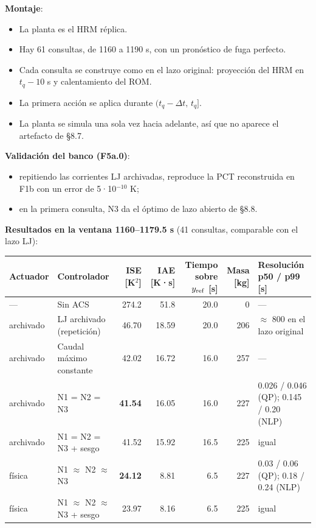 \documentclass[11pt,a4paper]{article}
\begin{document}
\textbf{Montaje}:

\begin{itemize}
\item La planta es el HRM réplica.
\item Hay 61 consultas, de 1160 a 1190 s, con un pronóstico de fuga perfecto.
\item Cada consulta se construye como en el lazo original: proyección del HRM en $t_q-10$ s y calentamiento del ROM.
\item La primera acción se aplica durante $(t_q-\Delta t,\,t_q]$.
\item La planta se simula una sola vez hacia adelante, así que no aparece el artefacto de \S{}8.7.
\end{itemize}

\textbf{Validación del banco (F5a.0)}:

\begin{itemize}
\item repitiendo las corrientes LJ archivadas, reproduce la PCT reconstruida en F1b con un error de 5·10$^{-10}$ K;
\item en la primera consulta, N3 da el óptimo de lazo abierto de \S{}8.8.
\end{itemize}

\textbf{Resultados en la ventana 1160–1179.5 s} (41 consultas, comparable con el lazo LJ):

{\footnotesize
\begin{xltabular}{\linewidth}{@{}YYRRRRY@{}}
\toprule
\textbf{Actuador} & \textbf{Controlador} & \textbf{ISE [K$^{2}$]} & \textbf{IAE [K·s]} & \textbf{Tiempo sobre $y_{\rm ref}$ [s]} & \textbf{Masa [kg]} & \textbf{Resolución p50 / p99 [s]} \\
\midrule
\endhead
— & Sin ACS & 274.2 & 51.8 & 20.0 & 0 & — \\
archivado & LJ archivado (repetición) & 46.70 & 18.59 & 20.0 & 206 & $\approx$ 800 en el lazo original \\
archivado & Caudal máximo constante & 42.02 & 16.72 & 16.0 & 257 & — \\
archivado & N1 = N2 = N3 & \textbf{41.54} & 16.05 & 16.0 & 227 & 0.026 / 0.046 (QP); 0.145 / 0.20 (NLP) \\
archivado & N1 = N2 = N3 + sesgo & 41.52 & 15.92 & 16.5 & 225 & igual \\
física & N1 $\approx$ N2 $\approx$ N3 & \textbf{24.12} & 8.81 & 6.5 & 227 & 0.03 / 0.06 (QP); 0.18 / 0.24 (NLP) \\
física & N1 $\approx$ N2 $\approx$ N3 + sesgo & 23.97 & 8.16 & 6.5 & 225 & igual \\
\bottomrule
\end{xltabular}}
\end{document}
